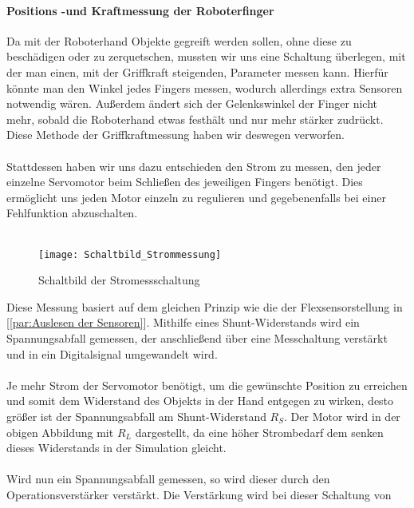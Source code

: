 \documentclass[titlepage,12pt,twoside]{article}
\begin{document}
\paragraph{Positions -und Kraftmessung der Roboterfinger}
\label{par:Positions -und Kraftmessung der Roboterfinger}
\hfill \break
\hfill \break
Da mit der Roboterhand Objekte gegreift werden sollen, ohne diese zu beschädigen oder zu zerquetschen, mussten wir uns eine Schaltung überlegen,
mit der man einen, mit der Griffkraft steigenden, Parameter messen kann. Hierfür könnte man den Winkel jedes Fingers messen, wodurch
allerdings extra Sensoren notwendig wären. Außerdem ändert sich der Gelenkswinkel der Finger nicht mehr, sobald die Roboterhand
etwas festhält und nur mehr stärker zudrückt. Diese Methode der Griffkraftmessung haben wir deswegen verworfen. \\
\\
Stattdessen haben wir uns dazu entschieden den Strom zu messen, den jeder einzelne Servomotor beim Schließen des jeweiligen Fingers
benötigt. Dies ermöglicht uns jeden Motor einzeln zu regulieren und gegebenenfalls bei einer Fehlfunktion abzuschalten. \\
\\
\begin{figure}[H]
	\begin{center}
		\scalebox{1.0}
		{\texttt{[image: Schaltbild\_Strommessung]}}
		\caption{Schaltbild der Stromessschaltung}
		\label{fig:Schaltbild_Strommessung}		
	\end{center}
\end{figure}
\hfill \break
Diese Messung basiert auf dem gleichen Prinzip wie die der Flexsensorstellung in [\textcolor{blue}{\autoref{par:Auslesen der Sensoren}}]. Mithilfe eines 
Shunt-Widerstands wird ein Spannungsabfall gemessen, der anschließend über eine Messchaltung verstärkt und in ein Digitalsignal
umgewandelt wird. \\
\\
Je mehr Strom der Servomotor benötigt, um die gewünschte Position zu erreichen und somit dem Widerstand des Objekts in der Hand entgegen
zu wirken, desto größer ist der Spannungsabfall am Shunt-Widerstand $R_{S}$. Der Motor wird in der obigen Abbildung mit $R_{L}$ dargestellt,
da eine höher Strombedarf dem senken dieses Widerstands in der Simulation gleicht. \\
\\
Wird nun ein Spannungsabfall gemessen, so wird dieser durch den Operationsverstärker verstärkt. Die Verstärkung wird bei dieser Schaltung von 
\end{document}
